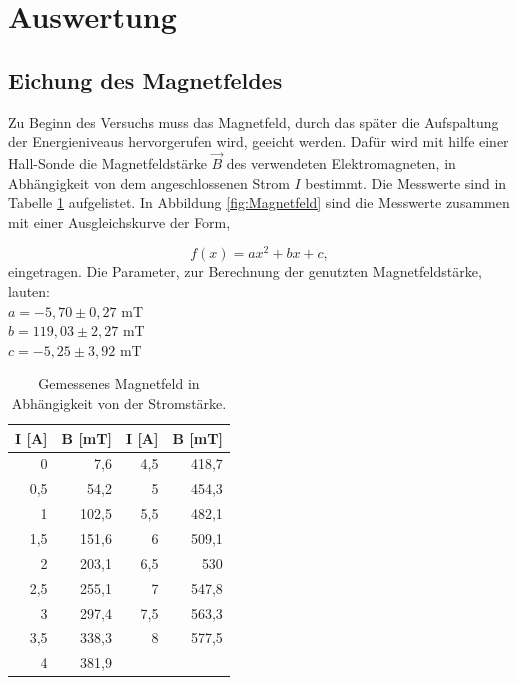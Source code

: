 \section{Auswertung}
\label{sec:Auswertung}

\subsection{Eichung des Magnetfeldes}
\label{sec:Magnetfeld}
Zu Beginn des Versuchs muss das Magnetfeld, durch das später die Aufspaltung der Energieniveaus hervorgerufen wird, geeicht werden. 
Dafür wird mit hilfe einer Hall-Sonde die Magnetfeldstärke $\vec{B}$ des verwendeten Elektromagneten, in Abhängigkeit von dem 
angeschlossenen Strom $I$ bestimmt.
Die Messwerte sind in Tabelle \ref{tab:Magnetfeld} aufgelistet.
In Abbildung \ref{fig:Magnetfeld} sind die Messwerte zusammen mit einer Ausgleichskurve der Form,

\begin{equation}
  f(x) = a x^2 + b x + c ,
\end{equation}
  eingetragen.
  Die Parameter, zur Berechnung der genutzten Magnetfeldstärke, lauten: \\
  $a = -5,70 \pm 0,27$ mT \\
  $b = 119,03 \pm 2,27$ mT \\
  $c = -5,25 \pm 3,92$ mT \\
 

\begin{table}
  \centering
  \footnotesize
  \caption{Gemessenes Magnetfeld in Abhängigkeit von der Stromstärke.}
  \label{tab:Magnetfeld}

  \begin{tabular}{r r | r r}
    \toprule
    I [A] & B [mT] & I [A] & B [mT] \\
    \midrule
    0   & 7,6   & 4,5   & 418,7 \\
    0,5 & 54,2  & 5     & 454,3 \\
    1   & 102,5 & 5,5   & 482,1 \\
    1,5 & 151,6 & 6     & 509,1 \\
    2   & 203,1 & 6,5   & 530   \\
    2,5 & 255,1 & 7     & 547,8 \\
    3   & 297,4 & 7,5   & 563,3 \\
    3,5 & 338,3 & 8     & 577,5 \\
    4   & 381,9 & & \\
    \bottomrule
  \end{tabular}
\end{table}


